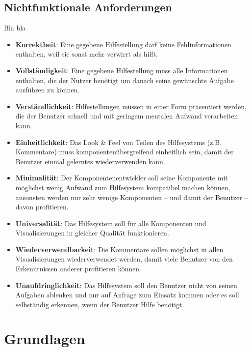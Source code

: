 \documentclass[
	headsepline,
	footsepline,
	fontsize=12pt,
	bibliography=totoc
]{scrbook}
\begin{document}
\subsection{Nichtfunktionale Anforderungen}
\label{section:standderforschung:anforderungsanalyse:nichtfunktionale_anforderungen}

Bla bla

\begin{itemize}
	\item\textbf{Korrektheit}: Eine gegebene Hilfestellung darf keine Fehlinformationen enthalten, weil sie sonst mehr verwirrt als hilft.
	\item\textbf{Vollständigkeit}: Eine gegebene Hilfestellung muss alle Informationen enthalten, die der Nutzer benötigt um danach seine gewünschte Aufgabe ausführen zu können.
	\item\textbf{Verständlichkeit}: Hilfestellungen müssen in einer Form präsentiert werden, die der Benutzer schnell und mit geringem mentalen Aufwand verarbeiten kann.
	\item\textbf{Einheitlichkeit}: Das Look \& Feel von Teilen des Hilfesystems (z.B. Kommentare) muss komponentenübergreifend einheitlich sein, damit der Benutzer einmal gelerntes wiederverwenden kann.
	\item\textbf{Minimalität}: Der Komponentenentwickler soll seine Komponente mit möglichst wenig Aufwand zum Hilfesystem kompatibel machen können, ansonsten werden nur sehr wenige Komponenten -- und damit der Benutzer -- davon profitieren.
	\item\textbf{Universalität}: Das Hilfesystem soll für alle Komponenten und Visualisierungen in gleicher Qualität funktionieren.
	\item\textbf{Wiederverwendbarkeit}: Die Kommentare sollen möglichst in allen Visualisierungen wiederverwendet werden, damit viele Benutzer von den Erkenntnissen anderer profitieren können.
	\item\textbf{Unaufdringlichkeit}: Das Hilfesystem soll den Benutzer nicht von seinen Aufgaben ablenken und nur auf Anfrage zum Einsatz kommen oder es soll selbständig erkennen, wenn der Benutzer Hilfe benötigt.
\end{itemize}

\section{Grundlagen}
\label{section:standderforschung:grundlagen}
\end{document}

